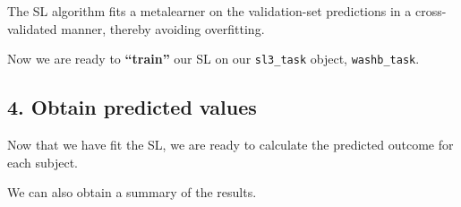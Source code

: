 \documentclass[12pt, krantz2,]{book}
\newenvironment{Shaded}{\begin{snugshade}}{\end{snugshade}}
\newcommand{\CommentTok}[1]{\textcolor[rgb]{0.56,0.35,0.01}{\textit{#1}}}
\newcommand{\DecValTok}[1]{\textcolor[rgb]{0.00,0.00,0.81}{#1}}
\newcommand{\KeywordTok}[1]{\textcolor[rgb]{0.13,0.29,0.53}{\textbf{#1}}}
\newcommand{\NormalTok}[1]{#1}
\newcommand{\OperatorTok}[1]{\textcolor[rgb]{0.81,0.36,0.00}{\textbf{#1}}}
\newcommand{\StringTok}[1]{\textcolor[rgb]{0.31,0.60,0.02}{#1}}
\theoremstyle{definition}
\theoremstyle{definition}
\theoremstyle{definition}
\newcommand{\1}{\mathbbm{1}}
\begin{document}
The SL algorithm fits a metalearner on the validation-set predictions in a
cross-validated manner, thereby avoiding overfitting.

Now we are ready to \textbf{``train''} our SL on our \texttt{sl3\_task} object, \texttt{washb\_task}.

\begin{Shaded}
\end{Shaded}

\hypertarget{obtain-predicted-values}{%
\subsection*{4. Obtain predicted values}\label{obtain-predicted-values}}


Now that we have fit the SL, we are ready to calculate the predicted outcome
for each subject.

\begin{Shaded}
\end{Shaded}

We can also obtain a summary of the results.
\end{document}
